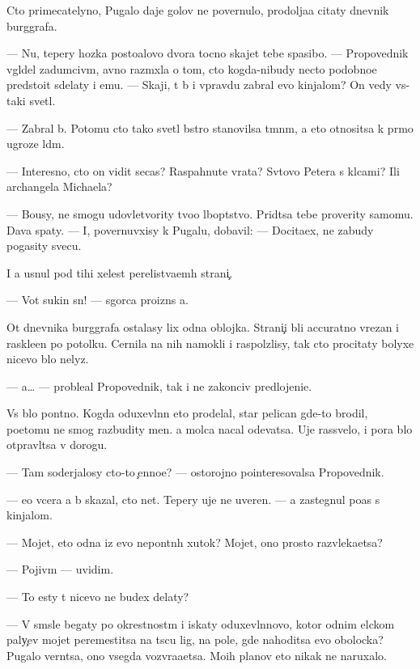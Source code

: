 \documentclass[10pt]{book}
\begin{document}
Cto primecatelyno, Pugalo daje golov{\yi} ne povernulo, prodolja{\y}a citaty dnevnik burggrafa.

— Nu, tepery hoz{\ia}{\y}ka posto{\y}alovo dvora tocno skajet tebe spasibo. — Propovednik v{\yi}gl{\ia}del zadumciv{\yi}m, {\y}avno razm{\yi}xl{\ia}{\y}a o tom, cto kogda-nibudy necto podobno{\y}e predsto{\y}it sdelaty i {\y}emu. — Skaji, t{\yi} b{\yi} i vpravdu zabral {\y}evo kinjalom? On vedy vs{\e}-taki svetl{\yi}{\y}.

— Zabral b{\yi}. Potomu cto tako{\y} svetl{\yi}{\y} b{\yi}stro stanovilsa t{\e}mn{\yi}m, a eto otnositsa k pr{\ia}mo{\y} ugroze l{\io}d{\ia}m.

— Interesno, cto on vidit se{\y}cas? Raspahnut{\yi}{\y}e vrata? Sv{\ia}tovo Petera s kl{\io}cami? Ili archangela Michaela?

— Bo{\y}usy, ne smogu udovletvority tvo{\y}o l{\io}bop{\yi}tstvo. Prid{\e}tsa tebe proverity samomu. Dava{\y} spaty. — I, povernuvxisy k Pugalu, dobavil: — Docita{\y}ex, ne zabudy pogasity svecu.

I {\y}a usnul pod tihi{\y} xelest perelist{\yi}va{\y}em{\yi}h strani{\c}.

— Vot sukin s{\yi}n! — sgor{\ia}ca proizn{\e}s {\y}a.

Ot dnevnika burggrafa ostalasy lix odna oblojka. Strani{\c}i b{\yi}li accuratno v{\yi}rezan{\yi} i raskle{\y}en{\yi} po potolku. Cernila na nih namokli i raspolzlisy, tak cto procitaty bolyxe nicevo b{\yi}lo nelyz{\ia}.

— {\Y}a… — proble{\y}al Propovednik, tak i ne zakonciv predlojeni{\y}e.

Vs{\e} b{\yi}lo pon{\ia}tno. Kogda oduxevl{\e}nn{\yi}{\y} eto prodelal, star{\yi}{\y} pelican gde-to brodil, poetomu ne smog razbudity men{\ia}. {\Y}a molca nacal odevatsa. Uje rassvelo, i pora b{\yi}lo otpravl{\ia}tsa v dorogu.

— Tam soderjalosy cto-to {\c}enno{\y}e? — ostorojno pointeresovalsa Propovednik.

— {\Y}e{\x}o vcera {\y}a b{\yi} skazal, cto net. Tepery uje ne uveren. — {\Y}a zastegnul po{\y}as s kinjalom.

— Mojet, eto odna iz {\y}evo nepon{\ia}tn{\yi}h xutok? Mojet, ono prosto razvleka{\y}etsa?

— Pojiv{\e}m — uvidim.

— To {\y}esty t{\yi} nicevo ne budex delaty?

— V sm{\yi}sle begaty po okrestnost{\ia}m i iskaty oduxevl{\e}nnovo, kotor{\yi}{\y} odnim {\x}elckom paly{\c}ev mojet peremestitsa na t{\yi}s{\ia}cu lig, na pole, gde nahoditsa {\y}evo obolocka? Pugalo vern{\e}tsa, ono vsegda vozvra{\x}a{\y}etsa. Mo{\y}ih planov eto nikak ne naruxalo.
\end{document}
